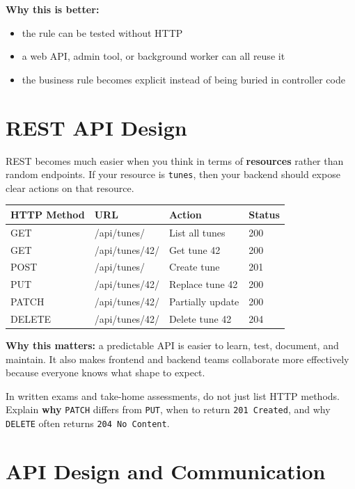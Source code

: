 \documentclass[12pt, a4paper, oneside]{book}
\begin{document}
\textbf{Why this is better:}
\begin{itemize}[leftmargin=2em]
    \item the rule can be tested without HTTP
    \item a web API, admin tool, or background worker can all reuse it
    \item the business rule becomes explicit instead of being buried in controller code
\end{itemize}

\section{REST API Design}

REST becomes much easier when you think in terms of \textbf{resources} rather than random endpoints. If your resource is \texttt{tunes}, then your backend should expose clear actions on that resource.

\begin{center}
\begin{tabular}{l l l l}
\toprule
\textbf{HTTP Method} & \textbf{URL} & \textbf{Action} & \textbf{Status} \\
\midrule
GET & /api/tunes/ & List all tunes & 200 \\
GET & /api/tunes/42/ & Get tune 42 & 200 \\
POST & /api/tunes/ & Create tune & 201 \\
PUT & /api/tunes/42/ & Replace tune 42 & 200 \\
PATCH & /api/tunes/42/ & Partially update & 200 \\
DELETE & /api/tunes/42/ & Delete tune 42 & 204 \\
\bottomrule
\end{tabular}
\end{center}

\textbf{Why this matters:} a predictable API is easier to learn, test, document, and maintain. It also makes frontend and backend teams collaborate more effectively because everyone knows what shape to expect.

\begin{examtipbox}
In written exams and take-home assessments, do not just list HTTP methods. Explain \textbf{why} \texttt{PATCH} differs from \texttt{PUT}, when to return \texttt{201 Created}, and why \texttt{DELETE} often returns \texttt{204 No Content}.
\end{examtipbox}

\section{API Design and Communication}
\end{document}
